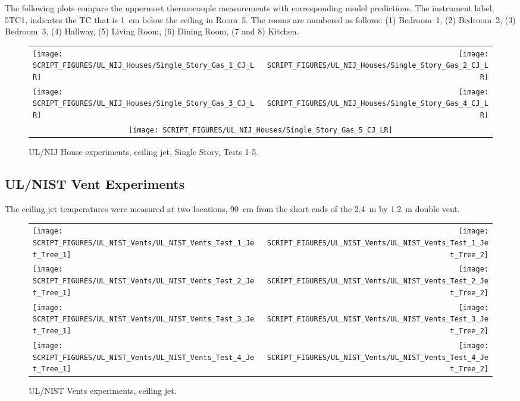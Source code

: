 The following plots compare the uppermost thermocouple measurements with corresponding model predictions. The instrument label, 5TC1, indicates the TC that is 1~cm below the ceiling in Room~5. The rooms are numbered as follows: (1) Bedroom~1, (2) Bedroom~2, (3) Bedroom~3, (4) Hallway, (5) Living Room, (6) Dining Room, (7 and 8) Kitchen.


\begin{figure}[!h]
\begin{tabular*}{\textwidth}{l@{\extracolsep{\fill}}r}
\texttt{[image: SCRIPT\_FIGURES/UL\_NIJ\_Houses/Single\_Story\_Gas\_1\_CJ\_LR]} &
\texttt{[image: SCRIPT\_FIGURES/UL\_NIJ\_Houses/Single\_Story\_Gas\_2\_CJ\_LR]} \\
\texttt{[image: SCRIPT\_FIGURES/UL\_NIJ\_Houses/Single\_Story\_Gas\_3\_CJ\_LR]} &
\texttt{[image: SCRIPT\_FIGURES/UL\_NIJ\_Houses/Single\_Story\_Gas\_4\_CJ\_LR]} \\
\multicolumn{2}{c}{\texttt{[image: SCRIPT\_FIGURES/UL\_NIJ\_Houses/Single\_Story\_Gas\_5\_CJ\_LR]} } \\
\end{tabular*}
\caption{UL/NIJ House experiments, ceiling jet, Single Story, Tests 1-5.}
\label{UL_NIJ_jet}
\end{figure}


\clearpage

\subsection{UL/NIST Vent Experiments}

The ceiling jet temperatures were measured at two locations, 90~cm from the short ends of the 2.4~m by 1.2~m double vent.

\newpage

\begin{figure}[p]
\begin{tabular*}{\textwidth}{l@{\extracolsep{\fill}}r}
\texttt{[image: SCRIPT\_FIGURES/UL\_NIST\_Vents/UL\_NIST\_Vents\_Test\_1\_Jet\_Tree\_1]} &
\texttt{[image: SCRIPT\_FIGURES/UL\_NIST\_Vents/UL\_NIST\_Vents\_Test\_1\_Jet\_Tree\_2]} \\
\texttt{[image: SCRIPT\_FIGURES/UL\_NIST\_Vents/UL\_NIST\_Vents\_Test\_2\_Jet\_Tree\_1]} &
\texttt{[image: SCRIPT\_FIGURES/UL\_NIST\_Vents/UL\_NIST\_Vents\_Test\_2\_Jet\_Tree\_2]} \\
\texttt{[image: SCRIPT\_FIGURES/UL\_NIST\_Vents/UL\_NIST\_Vents\_Test\_3\_Jet\_Tree\_1]} &
\texttt{[image: SCRIPT\_FIGURES/UL\_NIST\_Vents/UL\_NIST\_Vents\_Test\_3\_Jet\_Tree\_2]} \\
\texttt{[image: SCRIPT\_FIGURES/UL\_NIST\_Vents/UL\_NIST\_Vents\_Test\_4\_Jet\_Tree\_1]} &
\texttt{[image: SCRIPT\_FIGURES/UL\_NIST\_Vents/UL\_NIST\_Vents\_Test\_4\_Jet\_Tree\_2]}
\end{tabular*}
\caption{UL/NIST Vents experiments, ceiling jet.}
\label{UL_NIST_Ceiling_Jet}
\end{figure}



